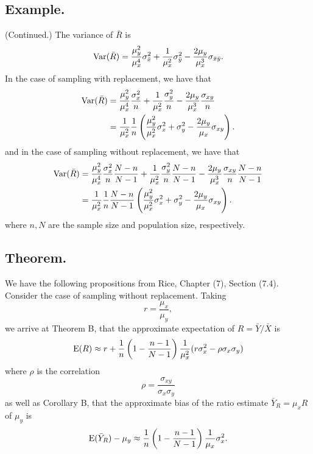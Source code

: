 \documentclass[titlepage]{article}
\begin{document}
\subsection{Example.} (Continued.) The variance of $\bar{R}$ is 
$$\text{Var}(\bar{R}) = \frac{\mu_{y}^{2}}{\mu_{x}^{4}}\sigma_{\bar{x}}^{2} + \frac{1}{\mu_{x}^{2}}\sigma_{\bar{y}}^{2} - \frac{2\mu_{y}}{\mu_{x}^{3}}\sigma_{\bar{x}\bar{y}}.$$
In the case of sampling with replacement, we have that 
\begin{align*}
    \text{Var}(\bar{R}) &= \frac{\mu_{y}^{2}}{\mu_{x}^{4}}\frac{\sigma_{x}^{2}}{n} + \frac{1}{\mu_{x}^{2}}\frac{\sigma_{y}^{2}}{n} - \frac{2\mu_{y}}{\mu_{x}^{3}}\frac{\sigma_{xy}}{n} \\
            &= \frac{1}{\mu_{x}^{2}}\frac{1}{n}\left(\frac{\mu_{y}^{2}}{\mu_{x}^{2}}\sigma_{x}^{2} + \sigma_{y}^{2} 
               - \frac{2\mu_{y}}{\mu_{x}}\sigma_{xy}\right).
\end{align*}
and in the case of sampling without replacement, we have that 
\begin{align*}
    \text{Var}(\bar{R}) &= \frac{\mu_{y}^{2}}{\mu_{x}^{4}}\frac{\sigma_{x}^{2}}{n}\frac{N - n}{N - 1} + \frac{1}{\mu_{x}^{2}}\frac{\sigma_{y}^{2}}{n}\frac{N - n}{N - 1} - \frac{2\mu_{y}}{\mu_{x}^{3}}\frac{\sigma_{xy}}{n}\frac{N - n}{N - 1} \\
            &= \frac{1}{\mu_{x}^{2}}\frac{1}{n}\frac{N-n}{N-1}\left(\frac{\mu_{y}^{2}}{\mu_{x}^{2}}\sigma_{x}^{2} + \sigma_{y}^{2} - \frac{2\mu_{y}}{\mu_{x}}\sigma_{xy}\right).
\end{align*}
where $n, N$ are the sample size and population size, respectively.

\subsection{Theorem.} We have the following propositions from Rice, Chapter (7), Section (7.4). Consider the case of sampling without replacement. Taking 
$$r = \frac{\mu_{x}}{\mu_{y}},$$
we arrive at Theorem B, that the approximate expectation of $R = \bar{Y}/\bar{X}$ is 
$$\text{E}(R) \approx r + \frac{1}{n}\left(1 - \frac{n-1}{N-1}\right)\frac{1}{\mu_{x}^{2}}
(r\sigma_{x}^{2} - \rho\sigma_{x}\sigma_{y})$$
where $\rho$ is the correlation 
$$\rho = \frac{\sigma_{xy}}{\sigma_{x}\sigma_{y}}$$
as well as Corollary B, that the approximate bias of the ratio estimate $\bar{Y}_{R} = \mu_{x}R$ of $\mu_{y}$ is 
$$\text{E}(\bar{Y}_{R}) - \mu_{y} \approx \frac{1}{n}\left(1 - \frac{n-1}{N-1}\right)\frac{1}{\mu_{x}}\sigma_{x}^{2}.$$
\end{document}
